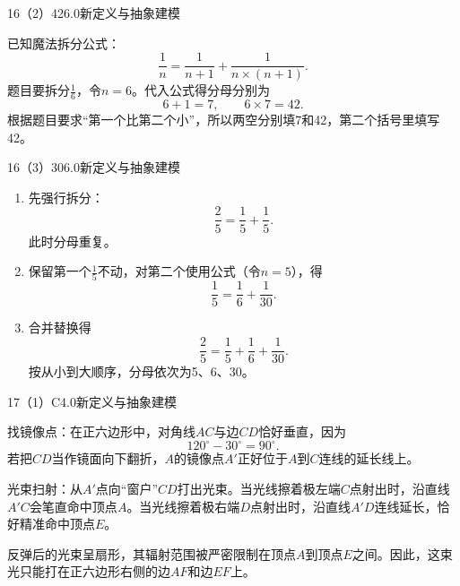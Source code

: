 \begin{solution}{16（2）}{42}{6.0}{新定义与抽象建模}

已知魔法拆分公式：
\[
  \frac1n=\frac1{n+1}+\frac1{n\times(n+1)}.
\]
题目要拆分\(\frac16\)，令\(n=6\)。代入公式得分母分别为
\[
  6+1=7,\qquad 6\times7=42.
\]
根据题目要求“第一个比第二个小”，所以两空分别填7和42，第二个括号里填写42。

\end{solution}

\begin{solution}{16（3）}{30}{6.0}{新定义与抽象建模}

\begin{enumerate}[label=\textbf{Step \arabic*:},leftmargin=*]
  \item 先强行拆分：
  \[
    \frac25=\frac15+\frac15.
  \]
  此时分母重复。
  \item 保留第一个\(\frac15\)不动，对第二个使用公式（令\(n=5\)），得
  \[
    \frac15=\frac16+\frac1{30}.
  \]
  \item 合并替换得
  \[
    \frac25=\frac15+\frac16+\frac1{30}.
  \]
  按从小到大顺序，分母依次为5、6、30。
\end{enumerate}

\end{solution}

\begin{solution}{17（1）}{C}{4.0}{新定义与抽象建模}

找镜像点：在正六边形中，对角线\(AC\)与边\(CD\)恰好垂直，因为
\[
  120^\circ-30^\circ=90^\circ.
\]
若把\(CD\)当作镜面向下翻折，\(A\)的镜像点\(A'\)正好位于\(A\)到\(C\)连线的延长线上。

光束扫射：从\(A'\)点向“窗户”\(CD\)打出光束。当光线擦着极左端\(C\)点射出时，沿直线\(A'C\)会笔直命中顶点\(A\)。当光线擦着极右端\(D\)点射出时，沿直线\(A'D\)连线延长，恰好精准命中顶点\(E\)。

反弹后的光束呈扇形，其辐射范围被严密限制在顶点\(A\)到顶点\(E\)之间。因此，这束光只能打在正六边形右侧的边\(AF\)和边\(EF\)上。

\end{solution}


